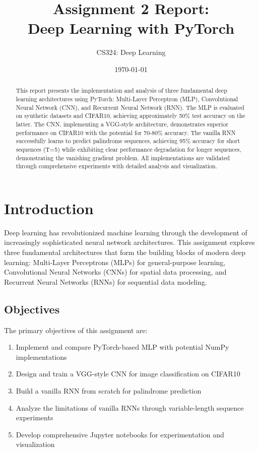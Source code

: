 \documentclass[11pt,a4paper]{article}
\title{\textbf{Assignment 2 Report: \\
Deep Learning with PyTorch}}
\author{CS324: Deep Learning}
\date{\today}
\begin{document}
\maketitle

\begin{abstract}
This report presents the implementation and analysis of three fundamental deep learning architectures using PyTorch: Multi-Layer Perceptron (MLP), Convolutional Neural Network (CNN), and Recurrent Neural Network (RNN). The MLP is evaluated on synthetic datasets and CIFAR10, achieving approximately 50\% test accuracy on the latter. The CNN, implementing a VGG-style architecture, demonstrates superior performance on CIFAR10 with the potential for 70-80\% accuracy. The vanilla RNN successfully learns to predict palindrome sequences, achieving 95\% accuracy for short sequences (T=5) while exhibiting clear performance degradation for longer sequences, demonstrating the vanishing gradient problem. All implementations are validated through comprehensive experiments with detailed analysis and visualization.
\end{abstract}

\section{Introduction}

Deep learning has revolutionized machine learning through the development of increasingly sophisticated neural network architectures. This assignment explores three fundamental architectures that form the building blocks of modern deep learning: Multi-Layer Perceptrons (MLPs) for general-purpose learning, Convolutional Neural Networks (CNNs) for spatial data processing, and Recurrent Neural Networks (RNNs) for sequential data modeling.

\subsection{Objectives}

The primary objectives of this assignment are:
\begin{enumerate}
    \item Implement and compare PyTorch-based MLP with potential NumPy implementations
    \item Design and train a VGG-style CNN for image classification on CIFAR10
    \item Build a vanilla RNN from scratch for palindrome prediction
    \item Analyze the limitations of vanilla RNNs through variable-length sequence experiments
    \item Develop comprehensive Jupyter notebooks for experimentation and visualization
\end{enumerate}
\end{document}
